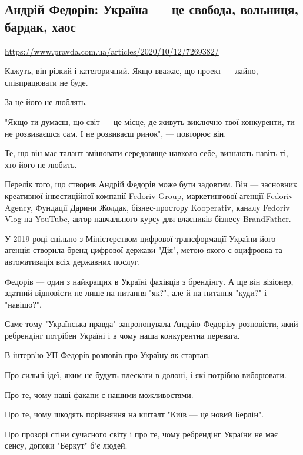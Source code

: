  
 

\subsection{Андрій Федорів: Україна --- це свобода, вольниця, бардак, хаос}

\url{https://www.pravda.com.ua/articles/2020/10/12/7269382/}

Кажуть, він різкий і категоричний. Якщо вважає, що проект --- лайно,
співпрацювати не буде.

За це його не люблять.

"Якщо ти думаєш, що світ --- це місце, де живуть виключно твої конкуренти, ти не
розвиваєшся сам. І не розвиваєш ринок", --- повторює він.

Те, що він має талант змінювати середовище навколо себе, визнають навіть ті,
хто його не любить.

Перелік того, що створив Андрій Федорів може бути задовгим. Він --- засновник
креативної інвестиційної компанії Fedoriv Group, маркетингової агенції Fedoriv
Agеncy, Фундації Дарини Жолдак, бізнес-простору Kooperativ, каналу Fedoriv Vlog
на YouTube, автор навчального курсу для власників бізнесу BrandFather.

У 2019 році спільно з Міністерством цифрової трансформації України його агенція
створила бренд цифрової держави "Дія", метою якого є оцифровка та автоматизація
всіх державних послуг.

Федорів --- один з найкращих в Україні фахівців з брендінгу. А ще він візіонер,
здатний відповісти не лише на питання "як?", але й на питання "куди?" і
"навіщо?".

Саме тому "Українська правда" запропонувала Андрію Федоріву розповісти, який
ребрендінг потрібен Україні і в чому наша конкурентна перевага.

В інтерв’ю УП Федорів розповів про Україну як стартап.

Про сильні ідеї, яким не будуть плескати в долоні, і які потрібно виборювати.

Про те, чому наші факапи є нашими можливостями.

Про те, чому шкодять порівняння на кшталт "Київ --- це новий Берлін".

Про прозорі стіни сучасного світу і про те, чому ребрендінг України не має
сенсу, допоки "Беркут" б’є людей.

